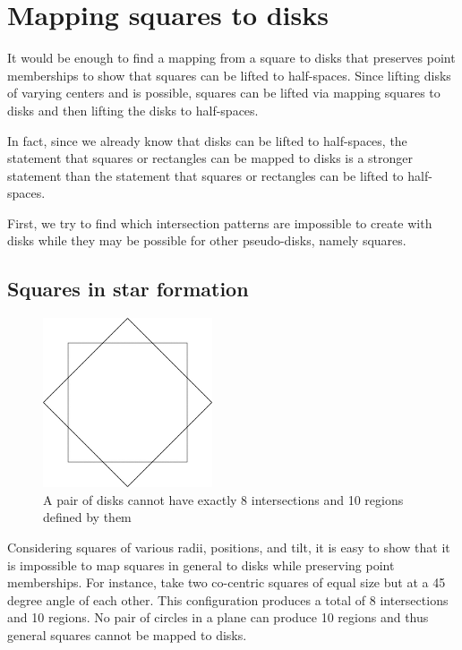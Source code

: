 \documentclass{NSF}
\begin{document}
\section{Mapping squares to disks}
It would be enough to find a mapping from a square to disks that preserves point memberships to show that squares can be lifted to half-spaces. Since lifting disks of varying centers and is possible, squares can be lifted via mapping squares to disks and then lifting the disks to half-spaces.

In fact, since we already know that disks can be lifted to half-spaces, the statement that squares or rectangles can be mapped to disks is a stronger statement than the statement that squares or rectangles can be lifted to half-spaces. 

First, we try to find which intersection patterns are impossible to create with disks while they may be possible for other pseudo-disks, namely squares.

\subsection{Squares in star formation}

\begin{figure}[ht]
\centering
\includegraphics[width=\textwidth,height=5cm,keepaspectratio]{cocentric-squares}
\caption{ A pair of disks cannot have exactly 8 intersections and 10 regions  defined by them }
\end{figure}

Considering squares of various radii, positions, and tilt, it is easy to show that it is impossible to map squares in general to disks while preserving point memberships. For instance, take two co-centric squares of equal size but at a 45 degree angle of each other. This configuration produces a total of 8 intersections and 10 regions. No pair of circles in a plane can produce 10 regions and thus general squares cannot be mapped to disks.
\end{document}

